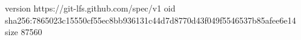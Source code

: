 version https://git-lfs.github.com/spec/v1
oid sha256:7865023c15550cf55ec8bb936131c44d7d8770d43f049f5546537b85afee6e14
size 87560
